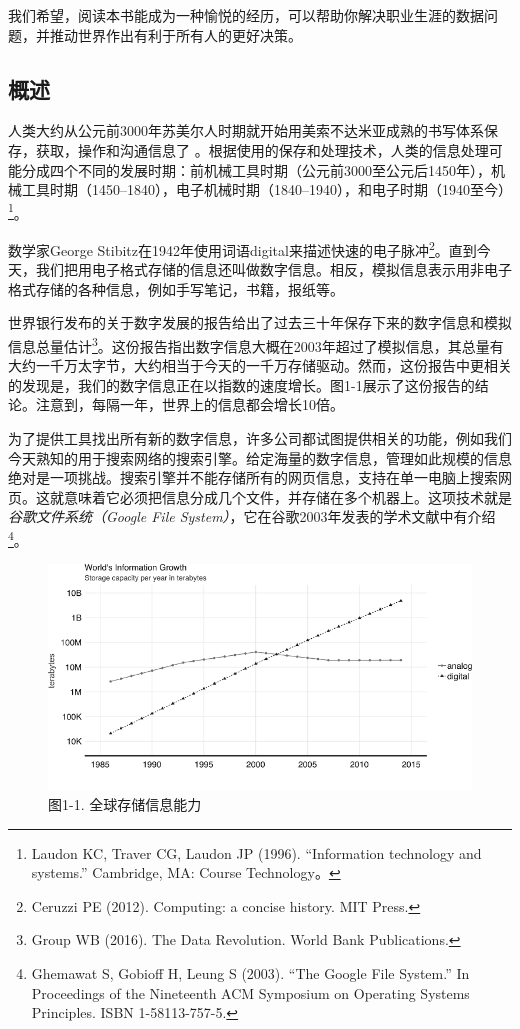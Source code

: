 \documentclass[
]{article}
\begin{document}
我们希望，阅读本书能成为一种愉悦的经历，可以帮助你解决职业生涯的数据问题，并推动世界作出有利于所有人的更好决策。

\hypertarget{ux6982ux8ff0}{%
\subsection{概述}\label{ux6982ux8ff0}}

人类大约从公元前3000年苏美尔人时期就开始用美索不达米亚成熟的书写体系保存，获取，操作和沟通信息了
。根据使用的保存和处理技术，人类的信息处理可能分成四个不同的发展时期：前机械工具时期（公元前3000至公元后1450年），机械工具时期（1450--1840），电子机械时期（1840--1940），和电子时期（1940至今）\footnote{Laudon
  KC, Traver CG, Laudon JP (1996). ``Information technology and
  systems.'' Cambridge, MA: Course Technology。}。

数学家George
Stibitz在1942年使用词语digital来描述快速的电子脉冲\footnote{Ceruzzi PE
  (2012). Computing: a concise history. MIT Press.}。直到今天，我们把用电子格式存储的信息还叫做数字信息。相反，模拟信息表示用非电子格式存储的各种信息，例如手写笔记，书籍，报纸等。

世界银行发布的关于数字发展的报告给出了过去三十年保存下来的数字信息和模拟信息总量估计\footnote{Group
  WB (2016). The Data Revolution. World Bank Publications.}。这份报告指出数字信息大概在2003年超过了模拟信息，其总量有大约一千万太字节，大约相当于今天的一千万存储驱动。然而，这份报告中更相关的发现是，我们的数字信息正在以指数的速度增长。图1-1展示了这份报告的结论。注意到，每隔一年，世界上的信息都会增长10倍。

为了提供工具找出所有新的数字信息，许多公司都试图提供相关的功能，例如我们今天熟知的用于搜索网络的搜索引擎。给定海量的数字信息，管理如此规模的信息绝对是一项挑战。搜索引擎并不能存储所有的网页信息，支持在单一电脑上搜索网页。这就意味着它必须把信息分成几个文件，并存储在多个机器上。这项技术就是\emph{谷歌文件系统（Google
File System）}，它在谷歌2003年发表的学术文献中有介绍\footnote{Ghemawat
  S, Gobioff H, Leung S (2003). ``The Google File System.'' In
  Proceedings of the Nineteenth ACM Symposium on Operating Systems
  Principles. ISBN 1-58113-757-5.}。

\begin{figure}
\centering
\includegraphics{figures/1_1.png}
\caption{图1-1. 全球存储信息能力}
\end{figure}
\end{document}
